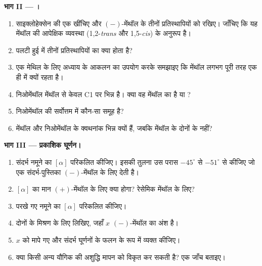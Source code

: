 \begin{problem}
\medskip
\noindent\textbf{भाग II --- ।}
\begin{enumerate}[resume]
  \item साइक्लोहेक्सेन की एक  खींचिए और $(-)$-मेंथॉल के तीनों प्रतिस्थापियों
        को  रखिए। जाँचिए कि यह मेंथॉल की
        आपेक्षिक व्यवस्था (1,2-\textit{trans} और 1,5-\textit{cis})
        के अनुरूप है।
  \item पलटी हुई  में तीनों प्रतिस्थापियों का क्या होता है?
  \item एक  मेथिल के लिए अध्याय के आकलन का उपयोग करके समझाइए
        कि मेंथॉल लगभग पूरी तरह एक ही  में क्यों रहता है।
  \item निओमेंथॉल मेंथॉल से केवल C1 पर भिन्न है। क्या वह मेंथॉल का  है या
        ?
  \item निओमेंथॉल की सर्वोत्तम  में कौन-सा समूह  है?
  \item मेंथॉल और निओमेंथॉल के क्वथनांक भिन्न क्यों हैं,
        जबकि मेंथॉल के दोनों  के नहीं?
\end{enumerate}

\medskip
\noindent\textbf{भाग III --- प्रकाशिक घूर्णन।}
\begin{enumerate}[resume]
  \item संदर्भ नमूने का $[\alpha]$ परिकलित कीजिए। इसकी तुलना उस परास $-45^\circ$ से
        $-51^\circ$ से कीजिए जो एक संदर्भ-पुस्तिका $(-)$-मेंथॉल के लिए देती है।
  \item $[\alpha]$ का मान $(+)$-मेंथॉल के लिए क्या होगा? रेसेमिक मेंथॉल के लिए?
  \item परखे गए नमूने का $[\alpha]$ परिकलित कीजिए।
  \item दोनों  के मिश्रण के लिए  लिखिए, जहाँ $x$
        $(-)$-मेंथॉल का अंश है।
  \item $x$ को मापे गए और संदर्भ घूर्णनों के फलन के रूप में
        व्यक्त कीजिए।
  \item क्या किसी अन्य यौगिक की  अशुद्धि
        मापन को विकृत कर सकती है? एक जाँच बताइए।
\end{enumerate}


\end{problem}
